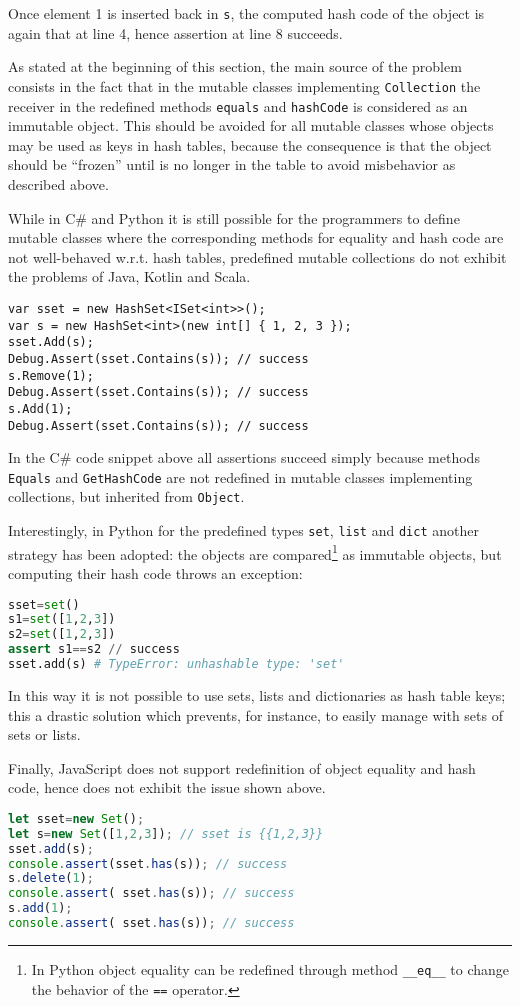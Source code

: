 Once element 1 is inserted back in \lstinline{s}, the computed hash code of the object is again that at line 4, hence assertion at line 8 succeeds. 

As stated at the beginning of this section, the main source of the problem consists in the fact that in the mutable classes implementing \lstinline{Collection} the receiver in the redefined methods \lstinline{equals} and \lstinline{hashCode} is considered as an immutable object. This should be avoided for all mutable classes whose objects may be used as keys in hash tables, because the consequence is that the object should be ``frozen'' until is no longer in the table to avoid misbehavior as described above.

While in C\# and Python it is still possible for the programmers to define mutable classes where the corresponding methods for
equality and hash code are not well-behaved w.r.t. hash tables, predefined mutable collections do not exhibit the problems of Java, Kotlin and Scala.
\begin{lstlisting}
var sset = new HashSet<ISet<int>>();
var s = new HashSet<int>(new int[] { 1, 2, 3 });
sset.Add(s);
Debug.Assert(sset.Contains(s)); // success
s.Remove(1);
Debug.Assert(sset.Contains(s)); // success 
s.Add(1);
Debug.Assert(sset.Contains(s)); // success
\end{lstlisting}
In the C\# code snippet above all assertions succeed simply because methods \lstinline{Equals} and \lstinline{GetHashCode} are not redefined
in mutable classes implementing collections, but inherited from \lstinline{Object}.

Interestingly, in Python for the predefined types \lstinline{set}, \lstinline{list} and \lstinline{dict} another strategy has been adopted: the objects are compared\footnote{In Python object equality can be redefined through method \lstinline{__eq__} to change the behavior of the \lstinline{==} operator.} as
immutable objects, but computing their hash code throws an exception:
\begin{lstlisting}[language=Python]
sset=set()                                                           
s1=set([1,2,3])
s2=set([1,2,3])
assert s1==s2 // success
sset.add(s) # TypeError: unhashable type: 'set'       
\end{lstlisting}
In this way it is not possible to use sets, lists and dictionaries as hash table keys; this a drastic solution which prevents, for instance, to easily manage with sets of sets or lists. 

Finally, JavaScript does not support redefinition of object equality and hash code, hence does not exhibit the issue shown above. 
\begin{lstlisting}[language=Javascript]
let sset=new Set();                                                           
let s=new Set([1,2,3]); // sset is {{1,2,3}}                                                         
sset.add(s);
console.assert(sset.has(s)); // success
s.delete(1);
console.assert( sset.has(s)); // success
s.add(1);
console.assert( sset.has(s)); // success
\end{lstlisting}
